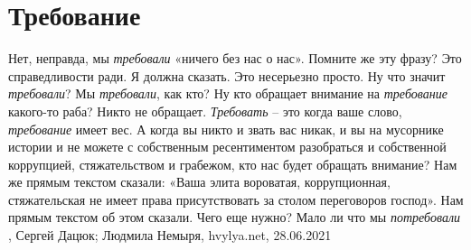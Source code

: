  
 
 
 
 
\chapter{Требование}
\label{sec:slova.trebovanie}

Нет, неправда, мы \emph{требовали} «ничего без нас о нас». Помните же эту
фразу? Это справедливости ради. Я должна сказать. Это несерьезно просто. Ну
что значит \emph{требовали}? Мы \emph{требовали}, как кто? Ну кто обращает
внимание на \emph{требование} какого-то раба? Никто не обращает.
\emph{Требовать} – это когда ваше слово, \emph{требование} имеет вес. А когда
вы никто и звать вас никак, и вы на мусорнике истории и не можете с собственным
ресентиментом разобраться и собственной коррупцией, стяжательством и грабежом,
кто нас будет обращать внимание? Нам же прямым текстом сказали: «Ваша элита
вороватая, коррупционная, стяжательская не имеет права присутствовать за столом
переговоров господ». Нам прямым текстом об этом сказали. Чего еще нужно? Мало
ли что мы \emph{потребовали}
, 
Сергей Дацюк; Людмила Немыря, hvylya.net, 28.06.2021

